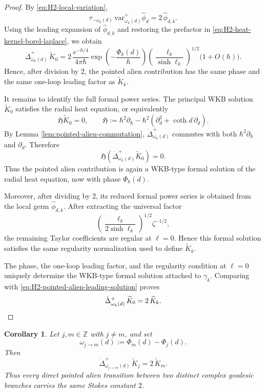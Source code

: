 \documentclass[11pt]{amsart}
\theoremstyle{plain}
\newtheorem{cor}[thm]{Corollary}
\theoremstyle{definition}
\newcommand{\Z}{\mathbb Z}
\newcommand{\var}{\text{var}}
\begin{document}
\begin{proof}
By \eqref{eq:H2-local-variation},
\[
\tau_{-\omega_k(d)}\,
\var_{\omega_k(d)}^{+}\widehat\phi_d
=2\,\widehat\phi_{d,k}.
\]
Using the leading expansion of $\widehat\phi_{d,k}$ and restoring the
prefactor in \eqref{eq:H2-heat-kernel-borel-laplace}, we obtain
\begin{equation}\label{eq:H2-pointed-alien-leading-solution}
\dot\Delta_{\omega_k(d)}^{+}\,
\widetilde{K}_0
=2\,\frac{e^{-\hbar/4}}{4\pi\hbar}
\exp\!\left(-\frac{\Phi_k(d)}{\hbar}
\right)\left(\frac{\ell_k}{\sinh\ell_k}
\right)^{1/2}\bigl(1+O(\hbar)\bigr).
\end{equation}
Hence, after division by $2$, the pointed alien contribution has the same
phase and the same one-loop leading factor as
$\widetilde{K}_k$.

It remains to identify the full formal power series.  The principal WKB
solution $\widetilde{K}_0$ satisfies the radial heat equation, or
equivalently
\[
\mathfrak H\widetilde{K}_0=0,\qquad
\mathfrak H:=\hbar^2\partial_\hbar
-\hbar^2\left(\partial_d^2+\coth d\,\partial_d
\right).
\]
By Lemma \ref{lem:pointed-alien-commutation},
$\dot\Delta_{\omega_k(d)}^{+}$ commutes with both $\hbar^2\partial_\hbar$ and $\partial_d$.  Therefore
\[
\mathfrak H
\left(\dot\Delta_{\omega_k(d)}^{+}\widetilde{K}_0\right)=0.
\]
Thus the pointed alien contribution is again a WKB-type formal solution of
the radial heat equation, now with phase $\Phi_k(d)$.

Moreover, after dividing by $2$, its reduced formal power series is obtained
from the local germ $\widehat\phi_{d,k}$.  After extracting the universal
factor
\[
\left(\frac{\ell_k}{2\sinh\ell_k}
\right)^{1/2}\zeta^{-1/2},
\]
the remaining Taylor coefficients are regular at $\ell=0$.  Hence this
formal solution satisfies the same regularity normalization used to define
$\widetilde{K}_k$.

The phase, the one-loop leading factor, and the regularity condition at
$\ell=0$ uniquely determine the WKB-type formal solution attached to
$\gamma_k$.  Comparing with
\eqref{eq:H2-pointed-alien-leading-solution} proves
\[
\dot\Delta_{\omega_k(d)}^{+}\,
\widetilde{K}_0=2\,\widetilde{K}_k.\qedhere
\]
\end{proof}

\begin{cor}
\label{cor:H2-pointed-alien-general-transition}
Let $j,m\in\Z$ with $j\neq m$, and set
\[
\omega_{j\to m}(d):=\Phi_m(d)-\Phi_j(d).
\]
Then
\begin{equation}\label{eq:H2-general-pointed-alien-transition}
\dot\Delta_{\omega_{j\to m}(d)}^{+}\,
\widetilde{K}_j=2\,\widetilde{K}_m.
\end{equation}
Thus every direct pointed alien transition between two distinct complex
geodesic branches carries the same Stokes constant $2$.
\end{cor}
\end{document}
